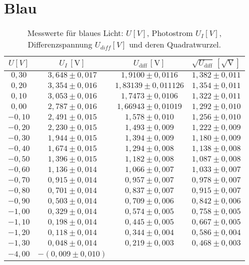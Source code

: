 \newpage

\section{Blau}
\begin{table}[h!]
    \centering
    \begin{tabular}{cccc}
    \hline
    $U [V]$ & $U_I \, [\mathrm{V}]$ & $U_{\text{diff}} \, [\mathrm{V}]$ & $\sqrt{U_{\text{diff}}} \, [\mathrm{\sqrt{V}}]$ \\
    \hline
    $0,30$ & $3,648 \pm 0,017$ & $1,9100 \pm 0,0116$ & $1,382 \pm 0,011$ \\
    $0,20$ & $3,354 \pm 0,016$ & $1,83139 \pm 0,011126$ & $1,354 \pm 0,011$ \\
    $0,10$ & $3,053 \pm 0,016$ & $1,7473 \pm 0,0106$ & $1,322 \pm 0,011$ \\
    $0,00$ & $2,787 \pm 0,016$ & $1,66943 \pm 0,01019$ & $1,292 \pm 0,010$ \\
    $-0,10$ & $2,491 \pm 0,015$ & $1,578 \pm 0,010$ & $1,256 \pm 0,010$ \\
    $-0,20$ & $2,230 \pm 0,015$ & $1,493 \pm 0,009$ & $1,222 \pm 0,009$ \\
    $-0,30$ & $1,944 \pm 0,015$ & $1,394 \pm 0,009$ & $1,180 \pm 0,009$ \\
    $-0,40$ & $1,674 \pm 0,015$ & $1,294 \pm 0,008$ & $1,138 \pm 0,008$ \\
    $-0,50$ & $1,396 \pm 0,015$ & $1,182 \pm 0,008$ & $1,087 \pm 0,008$ \\
    $-0,60$ & $1,136 \pm 0,014$ & $1,066 \pm 0,007$ & $1,033 \pm 0,007$ \\
    $-0,70$ & $0,915 \pm 0,014$ & $0,957 \pm 0,007$ & $0,978 \pm 0,007$ \\
    $-0,80$ & $0,701 \pm 0,014$ & $0,837 \pm 0,007$ & $0,915 \pm 0,007$ \\
    $-0,90$ & $0,503 \pm 0,014$ & $0,709 \pm 0,006$ & $0,842 \pm 0,006$ \\
    $-1,00$ & $0,329 \pm 0,014$ & $0,574 \pm 0,005$ & $0,758 \pm 0,005$ \\
    $-1,10$ & $0,198 \pm 0,014$ & $0,445 \pm 0,005$ & $0,667 \pm 0,005$ \\
    $-1,20$ & $0,118 \pm 0,014$ & $0,344 \pm 0,004$ & $0,586 \pm 0,004$ \\
    $-1,30$ & $0,048 \pm 0,014$ & $0,219 \pm 0,003$ & $0,468 \pm 0,003$ \\
    $-4,00$ & $-(0,009 \pm 0,010)$ & & \\
    \hline
    \end{tabular}
    \caption{Messwerte für blaues Licht: $U [V]$, Photostrom $U_I [V]$, Differenzspannung $U_{diff} [V]$ und deren Quadratwurzel.}
    \label{tab:blau_values}
\end{table}


